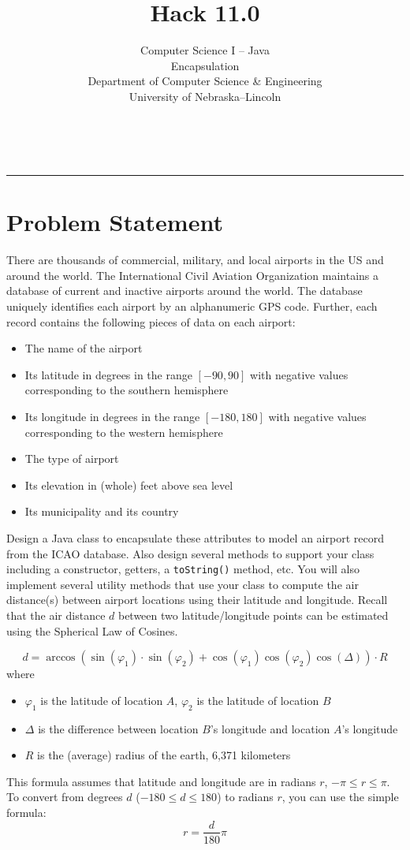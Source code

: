 \documentclass[12pt]{scrartcl}
\title{Hack 11.0}\let\Title\@title
\subtitle{Computer Science I -- Java\\
Encapsulation\\
{\small
\vskip1cm
Department of Computer Science \& Engineering \\
University of Nebraska--Lincoln}
\vskip-3cm}
\date{~}
\begin{document}
\maketitle

\hrule



\section*{Problem Statement}

There are thousands of commercial, military, and local airports in the US and
around the world.  The International Civil Aviation Organization maintains a
database of current and inactive airports around the world.  The database 
uniquely identifies each airport by an alphanumeric GPS code.  Further, each
record contains the following pieces of data on each airport:
\begin{itemize}
  \item The name of the airport
  \item Its latitude in degrees in the range $[-90, 90]$ with negative values corresponding to the southern hemisphere
  \item Its longitude in degrees in the range $[-180, 180]$ with negative values corresponding to the western hemisphere
  \item The type of airport 
  \item Its elevation in (whole) feet above sea level
  \item Its municipality and its country
\end{itemize}

Design a Java class to encapsulate these attributes to model an
airport record from the ICAO database.  Also design several methods
to support your class including a constructor, getters, a \texttt{toString()}
method, etc.  You will also implement several utility methods that 
use your class to compute the air
distance(s) between airport locations using their latitude and longitude.
Recall that the air distance $d$ between two latitude/longitude points can be 
estimated using the Spherical Law of Cosines.

 $$d = \arccos{(\sin(\varphi_1) \cdot \sin(\varphi_2) + \cos(\varphi_1) \cos(\varphi_2) \cos(\Delta) )} \cdot R$$
where
\begin{itemize}
  \item $\varphi_1$ is the latitude of location $A$, $\varphi_2$ is the latitude of location $B$
  \item $\Delta$ is the difference between location $B$'s longitude and location $A$'s longitude
  \item $R$ is the (average) radius of the earth, 6,371 kilometers
\end{itemize}
This formula assumes that latitude and longitude are in radians 
$r$, $-\pi \leq r \leq \pi$.  To convert from degrees $d$ ($-180 \leq d \leq 180$) 
to radians $r$, you can use the simple formula:
  $$r = \frac{d}{180} \pi$$
\end{document}
